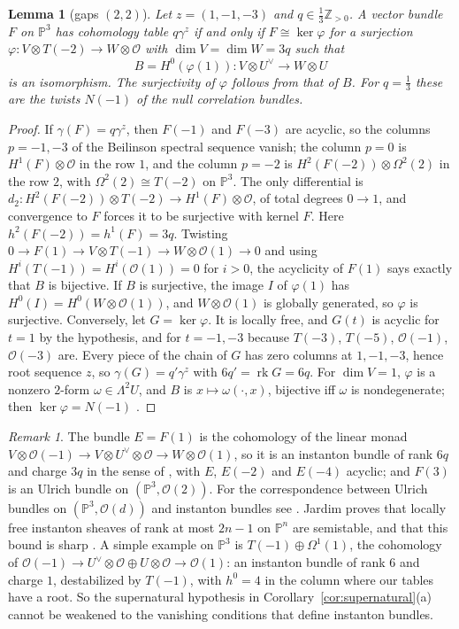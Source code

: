 \documentclass[11pt]{amsart}
\newtheorem{lemma}[theorem]{Lemma}
\theoremstyle{definition}
\theoremstyle{remark}
\newtheorem{remark}[theorem]{Remark}
\newcommand{\PP}{\mathbb{P}}
\newcommand{\ZZ}{\mathbb{Z}}
\newcommand{\OO}{\mathcal{O}}
\DeclareMathOperator{\rk}{rk}
\begin{document}
\begin{lemma}[gaps $(2,2)$]\label{lem:beil22}
Let $z=(1,-1,-3)$ and $q\in\frac13\ZZ_{>0}$. A vector bundle $F$ on $\PP^3$ has cohomology table $q\gamma^z$ if and only if $F\cong\ker\varphi$ for a surjection $\varphi\colon V\otimes T(-2)\to W\otimes\OO$ with $\dim V=\dim W=3q$ such that
\[
B=H^0(\varphi(1))\colon V\otimes U^\vee\longrightarrow W\otimes U
\]
is an isomorphism. The surjectivity of $\varphi$ follows from that of $B$. For $q=\frac13$ these are the twists $N(-1)$ of the null correlation bundles.
\end{lemma}

\begin{proof}
If $\gamma(F)=q\gamma^z$, then $F(-1)$ and $F(-3)$ are acyclic, so the columns $p=-1,-3$ of the Beilinson spectral sequence vanish; the column $p=0$ is $H^1(F)\otimes\OO$ in the row $1$, and the column $p=-2$ is $H^2(F(-2))\otimes\Omega^2(2)$ in the row $2$, with $\Omega^2(2)\cong T(-2)$ on $\PP^3$. The only differential is $d_2\colon H^2(F(-2))\otimes T(-2)\to H^1(F)\otimes\OO$, of total degrees $0\to1$, and convergence to $F$ forces it to be surjective with kernel $F$. Here $h^2(F(-2))=h^1(F)=3q$. Twisting $0\to F(1)\to V\otimes T(-1)\to W\otimes\OO(1)\to0$ and using $H^i(T(-1))=H^i(\OO(1))=0$ for $i>0$, the acyclicity of $F(1)$ says exactly that $B$ is bijective. If $B$ is surjective, the image $I$ of $\varphi(1)$ has $H^0(I)=H^0(W\otimes\OO(1))$, and $W\otimes\OO(1)$ is globally generated, so $\varphi$ is surjective. Conversely, let $G=\ker\varphi$. It is locally free, and $G(t)$ is acyclic for $t=1$ by the hypothesis, and for $t=-1,-3$ because $T(-3)$, $T(-5)$, $\OO(-1)$, $\OO(-3)$ are. Every piece of the chain of $G$ has zero columns at $1,-1,-3$, hence root sequence $z$, so $\gamma(G)=q'\gamma^z$ with $6q'=\rk G=6q$. For $\dim V=1$, $\varphi$ is a nonzero $2$-form $\omega\in\Lambda^2U$, and $B$ is $x\mapsto\omega(\cdot,x)$, bijective iff $\omega$ is nondegenerate; then $\ker\varphi=N(-1)$ \cite[I, \S4.2]{OSS}.
\end{proof}

\begin{remark}\label{rem:beil22}
The bundle $E=F(1)$ is the cohomology of the linear monad $V\otimes\OO(-1)\to V\otimes U^\vee\otimes\OO\to W\otimes\OO(1)$, so it is an instanton bundle of rank $6q$ and charge $3q$ in the sense of \cite{Ja06}, with $E$, $E(-2)$ and $E(-4)$ acyclic; and $F(3)$ is an Ulrich bundle on $(\PP^3,\OO(2))$. For the correspondence between Ulrich bundles on $(\PP^3,\OO(d))$ and instanton bundles see \cite[Thm.~3.6]{CMR21}. Jardim proves that locally free instanton sheaves of rank at most $2n-1$ on $\PP^n$ are semistable, and that this bound is sharp \cite{Ja06}. A simple example on $\PP^3$ is $T(-1)\oplus\Omega^1(1)$, the cohomology of $\OO(-1)\to U^\vee\otimes\OO\oplus U\otimes\OO\to\OO(1)$: an instanton bundle of rank $6$ and charge $1$, destabilized by $T(-1)$, with $h^0=4$ in the column where our tables have a root. So the supernatural hypothesis in Corollary~\ref{cor:supernatural}(a) cannot be weakened to the vanishing conditions that define instanton bundles.
\end{remark}
\end{document}

